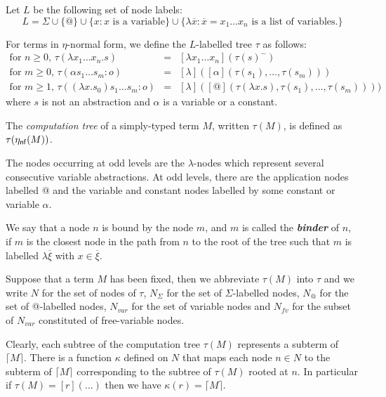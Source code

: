 \documentclass{llncs}
\newcommand\defname[1]{{\bf\em #1}\index{#1}}
\newcommand\aux[1]{\lceil #1\rceil}
\newcommand\etanf[1]{\eta_{\sf nf}(#1)}
\newcommand\union{\cup}
\begin{document}
\begin{definition}
Let $L$ be the following set of node labels:
$$ L = \Sigma \union \{ @ \} \union \{ x : x \mbox { is a variable} \}
\union \{ \lambda \overline{x} : \overline{x} = x_1 \ldots x_n \mbox { is a list of variables.} \}
  $$

For terms in $\eta$-normal form, we define the $L$-labelled tree $\tau$ as follows:
\begin{eqnarray*}
  \mbox{for $n\geq0$, } \tau(\lambda x_1 \ldots x_n . s) &=& [\lambda x_1 \ldots x_n](\tau(s)^{-}) \\
  \mbox{for $m\geq0$, } \tau( \alpha s_1 \ldots s_m : o) &=& [ \lambda ]([\alpha](\tau(s_1),\ldots,\tau(s_m)))\\
  \mbox{for $m \geq 1$, } \tau((\lambda x.s_0) s_1 \ldots s_m :o) &=& [\lambda] ([@](\tau(\lambda x.s),\tau(s_1),\ldots,\tau(s_m))) )
\end{eqnarray*}
where $s$ is not an abstraction and $\alpha$ is a variable or a constant.

The \emph{computation tree} of a simply-typed term $M$, written $\tau(M)$, is defined as $\tau(\etanf{M})$.
\end{definition}

The nodes occurring at odd levels are the $\lambda$-nodes which represent several consecutive variable abstractions.
At odd levels, there are the application nodes labelled @ and the variable and constant nodes labelled by some constant or variable $\alpha$.

We say that a node $n$ is bound by the node $m$, and $m$ is called the
\defname{binder} of $n$, if $m$ is the closest node in the path from $n$ to
the root of the tree such that $m$ is labelled $\lambda
\overline{\xi}$ with $x\in \overline{\xi}$.


Suppose that a term $M$ has been fixed, then we abbreviate $\tau(M)$ into $\tau$  and we write
$N$ for the set of nodes of $\tau$, $N_\Sigma$ for the set of $\Sigma$-labelled nodes,
$N_@$ for the set of @-labelled nodes, $N_{var}$ for the set of variable nodes and
$N_{fv}$ for the subset of $N_{var}$ constituted of free-variable nodes.


Clearly, each subtree of the computation tree $\tau(M)$ represents a subterm of $\aux{M}$.
There is a function $\kappa$ defined on $N$ that maps each node $n \in N$ to the subterm of $\aux{M}$ corresponding to the subtree of $\tau(M)$ rooted at $n$.
In particular if $\tau(M) = [r](\ldots)$ then we have $\kappa(r) = \aux{M}$.
\end{document}
